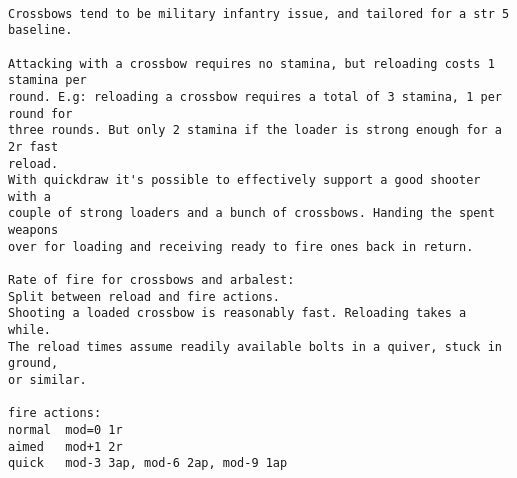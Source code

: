 \

\goodbreak \small \begin{samepage} \begin{verbatim}
Crossbows tend to be military infantry issue, and tailored for a str 5 baseline.

Attacking with a crossbow requires no stamina, but reloading costs 1 stamina per
round. E.g: reloading a crossbow requires a total of 3 stamina, 1 per round for
three rounds. But only 2 stamina if the loader is strong enough for a 2r fast
reload.
With quickdraw it's possible to effectively support a good shooter with a
couple of strong loaders and a bunch of crossbows. Handing the spent weapons
over for loading and receiving ready to fire ones back in return.

Rate of fire for crossbows and arbalest:
Split between reload and fire actions.
Shooting a loaded crossbow is reasonably fast. Reloading takes a while.
The reload times assume readily available bolts in a quiver, stuck in ground,
or similar.

fire actions:
normal  mod=0 1r
aimed   mod+1 2r
quick   mod-3 3ap, mod-6 2ap, mod-9 1ap


\end{verbatim}
\end{samepage}
